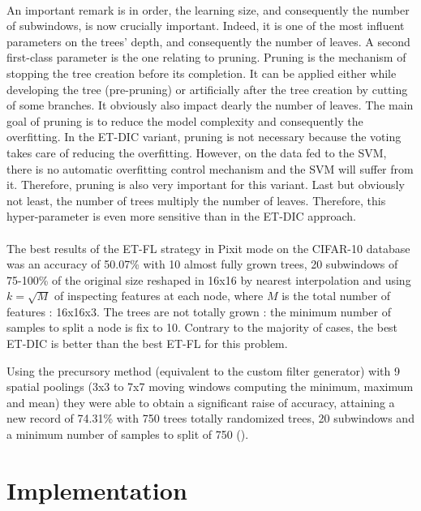 \documentclass[a4paper]{report}
\begin{document}
		\paragraph{}
		An important remark is in order, the learning size, and consequently the number of subwindows, is now crucially important. Indeed, it is one of the most influent parameters on the trees' depth, and consequently the number of leaves. 
		A second first-class parameter is the one relating to pruning. Pruning is the mechanism of stopping the tree creation before its completion. It can be applied either while developing the tree (pre-pruning) or artificially after the tree creation by cutting of some branches. It obviously also impact dearly the number of leaves. The main goal of pruning is to reduce the model complexity and consequently the overfitting. In the ET-DIC variant, pruning is not necessary because the voting takes care of reducing the overfitting. However, on the data fed to the SVM, there is no automatic overfitting control mechanism and the SVM will suffer from it. Therefore, pruning is also very important for this variant.
		Last but obviously not least, the number of trees multiply the number of leaves. Therefore, this hyper-parameter is even more sensitive than in the ET-DIC approach.
		
		\paragraph{}
		The best results of the ET-FL strategy in Pixit mode on the CIFAR-10 database was an accuracy of 50.07\% with 10 almost fully grown trees, 20 subwindows of 75-100\% of the original size reshaped in 16x16 by nearest interpolation and using $k = \sqrt{M}$ of inspecting features at each node, where $M$ is the total number of features : 16x16x3. The trees are not totally grown : the minimum number of samples to split a node is fix to 10. Contrary to the majority of cases, the best ET-DIC is better than the best ET-FL for this problem.
	\par
	Using the precursory method (equivalent to the custom filter generator) with 9 spatial poolings (3x3 to 7x7 moving windows computing the minimum, maximum and mean) they were able to obtain a significant raise of accuracy, attaining a new record of 74.31\% with 750 trees totally randomized trees, 20 subwindows and a minimum number of samples to split of 750 (\cite{base}).
			

	
	\section{Implementation}
	
\end{document}
